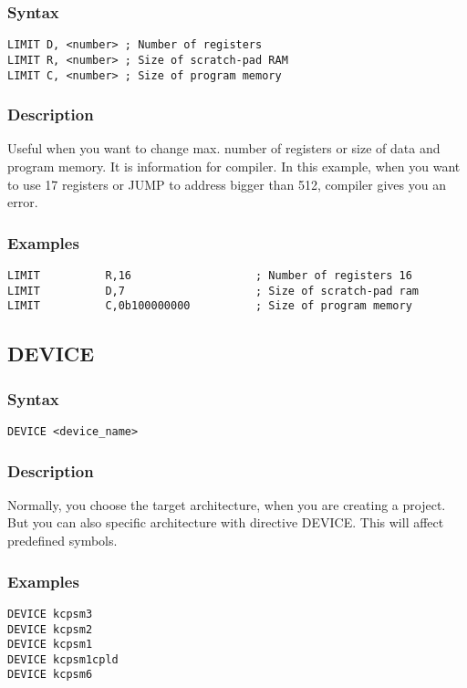         \subsubsection{Syntax}
            \verb'LIMIT D, <number> ; Number of registers'\\
            \verb'LIMIT R, <number> ; Size of scratch-pad RAM'\\
            \verb'LIMIT C, <number> ; Size of program memory'\\

        \subsubsection{Description}
            Useful when you want to change max. number of registers or size of  data and program memory. It is information for compiler. In this example, when you want to use 17 registers or JUMP to address bigger than 512, compiler gives you an error.

        \subsubsection{Examples}
            \verb'LIMIT          R,16                   ; Number of registers 16'\\
            \verb'LIMIT          D,7                    ; Size of scratch-pad ram   '\\
            \verb'LIMIT          C,0b100000000          ; Size of program memory '\\

    \subsection{DEVICE}
        \subsubsection{Syntax}
            \verb'DEVICE <device_name>'

        \subsubsection{Description}
            Normally, you choose the target architecture, when you are creating a project. But you can also specific architecture with directive DEVICE. This will affect predefined symbols.

        \subsubsection{Examples}
            \verb'DEVICE kcpsm3'\\
            \verb'DEVICE kcpsm2'\\
            \verb'DEVICE kcpsm1'\\
            \verb'DEVICE kcpsm1cpld'\\
            \verb'DEVICE kcpsm6'\\

